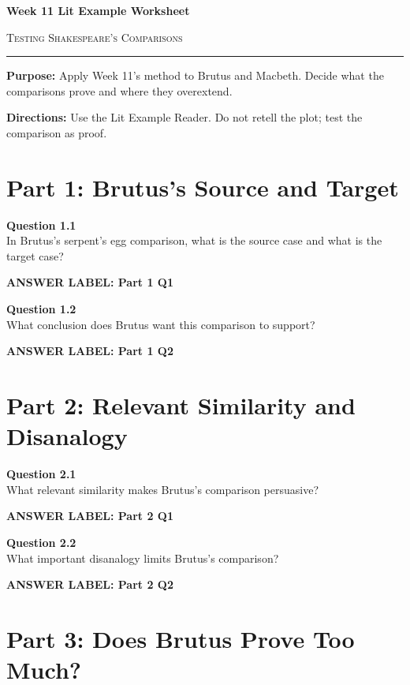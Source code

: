 \documentclass[12pt]{article}
\newcommand{\answerbox}[2]{%
\vspace{0.12em}
\noindent\textbf{#1}\par
\vspace{0.04em}
\noindent\fbox{%
\begin{minipage}[t][#2]{\dimexpr\textwidth-2\fboxsep-2\fboxrule}
\rule{\textwidth}{0pt}
\vspace{#2}
\end{minipage}}
\par\vspace{0.22em}}
\begin{document}
\begin{center}
{\LARGE\bfseries Week 11 Lit Example Worksheet}\par\vspace{0.05em}
{\large\scshape Testing Shakespeare's Comparisons}\par\vspace{0.12em}
\rule{0.78\textwidth}{0.5pt}
\end{center}

\textbf{Purpose:} Apply Week 11's method to Brutus and Macbeth. Decide what the comparisons prove and where they overextend.

\textbf{Directions:} Use the Lit Example Reader. Do not retell the plot; test the comparison as proof.

\section*{Part 1: Brutus's Source and Target}

\textbf{Question 1.1}\\[-0.15em]
In Brutus's serpent's egg comparison, what is the source case and what is the target case?

\answerbox{ANSWER LABEL: Part 1 Q1}{1.95in}

\textbf{Question 1.2}\\[-0.15em]
What conclusion does Brutus want this comparison to support?

\answerbox{ANSWER LABEL: Part 1 Q2}{2.05in}

\newpage

\section*{Part 2: Relevant Similarity and Disanalogy}

\textbf{Question 2.1}\\[-0.15em]
What relevant similarity makes Brutus's comparison persuasive?

\answerbox{ANSWER LABEL: Part 2 Q1}{2.25in}

\textbf{Question 2.2}\\[-0.15em]
What important disanalogy limits Brutus's comparison?

\answerbox{ANSWER LABEL: Part 2 Q2}{2.25in}

\newpage

\section*{Part 3: Does Brutus Prove Too Much?}
\end{document}
